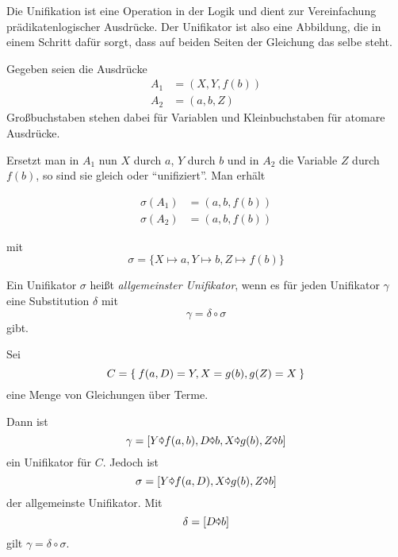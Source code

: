 \begin{definition}[Unifikation]%
    Die Unifikation ist eine Operation in der Logik und dient zur Vereinfachung
    prädikatenlogischer Ausdrücke.
    Der Unifikator ist also eine Abbildung, die in einem Schritt dafür sorgt, dass
    auf beiden Seiten der Gleichung das selbe steht.
\end{definition}

\begin{beispiel}
    Gegeben seien die Ausdrücke
    \begin{align*}
        A_1 &= \left(X, Y, f(b) \right)\\
        A_2 &= \left(a, b, Z \right)
    \end{align*}
    Großbuchstaben stehen dabei für Variablen und Kleinbuchstaben für atomare 
    Ausdrücke.

    Ersetzt man in $A_1$ nun $X$ durch $a$, $Y$ durch $b$ und in $A_2$ 
    die Variable $Z$ durch $f\left(b\right)$, so sind sie gleich oder 
    \enquote{unifiziert}. Man erhält

    \begin{align*}
        \sigma(A_1) &= \left(a, b, f(b) \right)\\
        \sigma(A_2) &= \left(a, b, f(b) \right)
    \end{align*}

    mit
    \[\sigma = \{X \mapsto a, Y \mapsto b, Z \mapsto f(b)\}\]
\end{beispiel}

\begin{definition}%
    Ein Unifikator $\sigma$ heißt \textit{allgemeinster Unifikator}, wenn 
    es für jeden Unifikator $\gamma$ eine Substitution $\delta$ mit
    \[\gamma = \delta \circ \sigma\]
    gibt.
\end{definition}

\begin{beispiel}
    Sei
    \[C = \Set{f(a,D) = Y, X = g(b), g(Z) = X}\]
    eine Menge von Gleichungen über Terme.

    Dann ist 
    \[\gamma = [Y \text{\pointer} f(a,b), D \text{\pointer} b, X \text{\pointer} g(b), Z \text{\pointer} b]\]
    ein Unifikator für $C$. Jedoch ist
    \[\sigma = [Y \text{\pointer} f(a,D), X \text{\pointer} g(b), Z \text{\pointer} b]\]
    der allgemeinste Unifikator. Mit
    \[\delta = [D \text{\pointer} b]\]
    gilt $\gamma = \delta \circ \sigma$.
\end{beispiel}

